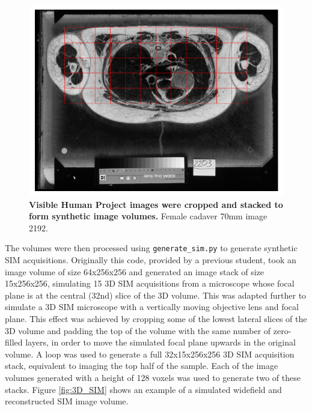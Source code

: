 \documentclass[12pt]{article}
\begin{document}
\begin{figure}[btp]
    \includegraphics[scale=0.65, center]{figures/visible_human_volumes_grey.png}
    \caption{\textbf{Visible Human Project images were cropped and stacked to form synthetic image volumes.}
    Female cadaver 70mm image 2192.}
    \label{fig:vhcrop}
\end{figure}

The volumes were then processed using \texttt{generate\_sim.py} to generate synthetic SIM acquisitions.
Originally this code, provided by a previous student, took an image volume of size 64x256x256 and generated an image stack of size 15x256x256,
simulating 15 3D SIM acquisitions from a microscope whose focal plane is at the central (32nd) slice of the 3D volume.
This was adapted further to simulate a 3D SIM microscope with a vertically moving objective lens and focal plane.
This effect was achieved by cropping some of the lowest lateral slices of the 3D volume and padding the top of the volume with the same number of zero-filled layers,
in order to move the simulated focal plane upwards in the original volume.
A loop was used to generate a full 32x15x256x256 3D SIM acquisition stack,
equivalent to imaging the top half of the sample.
Each of the image volumes generated with a height of 128 voxels was used to generate two of these stacks.
Figure \ref{fig:3D_SIM} shows an example of a simulated widefield and reconstructed SIM image volume.
\end{document}
